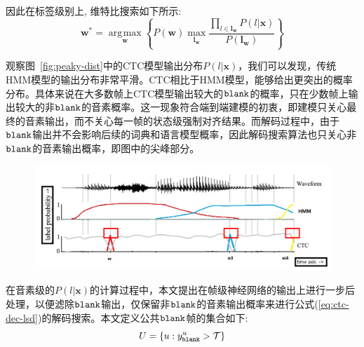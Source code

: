因此在标签级别上, 维特比搜索如下所示:
\begin{equation} \label{eq:ctc-dec-lsd}
   \mathbf{w}^* = \mathop{\arg\!\max}\limits_\mathbf{w} \left\{
        P(\mathbf{w})
        \mathop{\max}\limits_{\mathbf{l}_\mathbf{w}} \frac{ \prod_{l\in\mathbf{l}_\mathbf{w}} P(l|\mathbf{x}) }{P(\mathbf{l}_\mathbf{w})}\right\}
     \end{equation}

观察图~\ref{fig:peaky-dist}中的CTC模型输出分布$P(l|\mathbf{x})$，我们可以发现，传统HMM模型的输出分布非常平滑。CTC相比于HMM模型，能够给出更突出的概率分布。具体来说在大多数帧上CTC模型输出较大的$\tt blank$的概率，只在少数帧上输出较大的非$\tt blank$的音素概率。这一现象符合端到端建模的初衷，即建模只关心最终的音素输出，而不关心每一帧的状态级强制对齐结果。而解码过程中，由于$\tt blank$输出并不会影响后续的词典和语言模型概率，因此解码搜索算法也只关心非$\tt blank$的音素输出概率，即图中的尖峰部分。


\begin{figure}[!htp]
  \centering
    \captionstyle{\centering}
    \includegraphics[width=\textwidth]{figure/peaky_distribution.png}
\end{figure}

在音素级的$P(l|\mathbf{x})$的计算过程中，本文提出在帧级神经网络的输出上进行一步后处理，以便滤除$\tt blank$输出，仅保留非$\tt blank$的音素输出概率来进行公式(\ref{eq:ctc-dec-lsd})的解码搜索。本文定义公共$\tt blank$帧的集合如下:
  \begin{equation} \label{eq:com-blk-idx}
    U=\{u:y^{u}_{\tt{blank}} > \mathcal{T}\}
    \end{equation}


